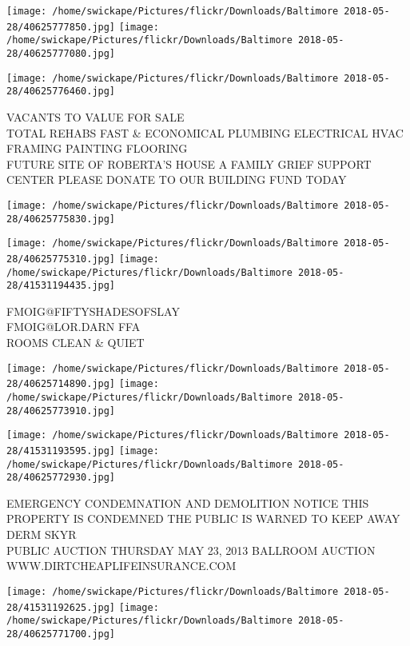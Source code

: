 \documentclass[10pt,letterpaper]{article}
\begin{document}
\texttt{[image: /home/swickape/Pictures/flickr/Downloads/Baltimore 2018-05-28/40625777850.jpg]}
\texttt{[image: /home/swickape/Pictures/flickr/Downloads/Baltimore 2018-05-28/40625777080.jpg]}

\texttt{[image: /home/swickape/Pictures/flickr/Downloads/Baltimore 2018-05-28/40625776460.jpg]}

VACANTS TO VALUE FOR SALE\\
TOTAL REHABS FAST \& ECONOMICAL PLUMBING ELECTRICAL HVAC FRAMING PAINTING FLOORING\\
FUTURE SITE OF ROBERTA'S HOUSE A FAMILY GRIEF SUPPORT CENTER PLEASE DONATE TO OUR BUILDING FUND TODAY\\
\pagebreak

\texttt{[image: /home/swickape/Pictures/flickr/Downloads/Baltimore 2018-05-28/40625775830.jpg]}

\vspace{0.25in}
\texttt{[image: /home/swickape/Pictures/flickr/Downloads/Baltimore 2018-05-28/40625775310.jpg]}
\texttt{[image: /home/swickape/Pictures/flickr/Downloads/Baltimore 2018-05-28/41531194435.jpg]}

FMOIG@FIFTYSHADESOFSLAY\\
FMOIG@LOR.DARN FFA\\
ROOMS CLEAN \& QUIET\\
\pagebreak

\texttt{[image: /home/swickape/Pictures/flickr/Downloads/Baltimore 2018-05-28/40625714890.jpg]}
\texttt{[image: /home/swickape/Pictures/flickr/Downloads/Baltimore 2018-05-28/40625773910.jpg]}

\texttt{[image: /home/swickape/Pictures/flickr/Downloads/Baltimore 2018-05-28/41531193595.jpg]}
\texttt{[image: /home/swickape/Pictures/flickr/Downloads/Baltimore 2018-05-28/40625772930.jpg]}

EMERGENCY CONDEMNATION AND DEMOLITION NOTICE THIS PROPERTY IS CONDEMNED THE PUBLIC IS WARNED TO KEEP AWAY\\
DERM SKYR\\
PUBLIC AUCTION THURSDAY MAY 23, 2013 BALLROOM AUCTION\\
WWW.DIRTCHEAPLIFEINSURANCE.COM\\
\pagebreak

\texttt{[image: /home/swickape/Pictures/flickr/Downloads/Baltimore 2018-05-28/41531192625.jpg]}
\texttt{[image: /home/swickape/Pictures/flickr/Downloads/Baltimore 2018-05-28/40625771700.jpg]}
\end{document}
